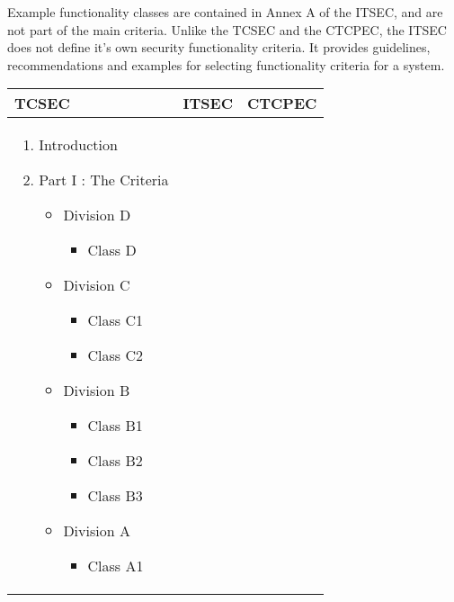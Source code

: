     Example functionality classes are contained in Annex A of the ITSEC, 
    and are not part of the main criteria.
    Unlike the TCSEC and the CTCPEC, the ITSEC does not define it's own
    security functionality criteria. It provides guidelines, recommendations
    and examples 
    for selecting functionality criteria for a system.

    \begin{table}[H]
    \begin{center} 
    \begin{tabular}{|>{\small \sffamily}p{5.3cm}
                    |>{\small \sffamily}p{5.3cm}
                    |>{\small \sffamily}p{5.3cm}|} \hline
        \bfseries{TCSEC} & \bfseries{ITSEC} & \bfseries{CTCPEC} \\ \hline \hline
        \begin{enumerate} 
            \item Introduction
            \item Part I : The Criteria
                \begin{itemize}
                    \item Division D
                        \begin{itemize}
                            \item Class D
                        \end{itemize}
                    \item Division C
                        \begin{itemize}
                            \item Class C1
                            \item Class C2
                        \end{itemize}
                    \item Division B
                        \begin{itemize}
                            \item Class B1
                            \item Class B2
                            \item Class B3
                        \end{itemize}
                    \item Division A
                        \begin{itemize}
                            \item Class A1
                        \end{itemize}

\end{itemize}
\end{enumerate}
\end{tabular}
\end{center}
\end{table}
